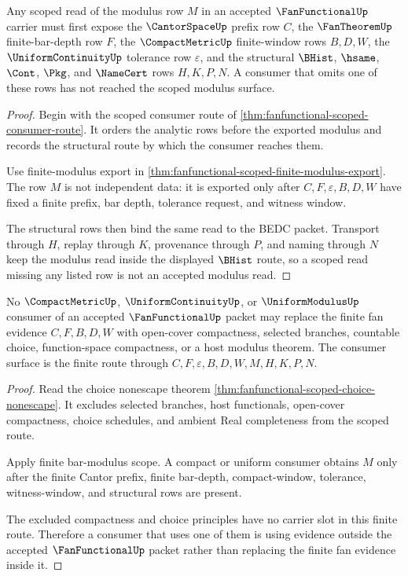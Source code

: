 \begin{theorem}
\label{thm:fanfunctional-finite-bar-modulus-scope}
Any scoped read of the modulus row $M$ in an accepted $\FanFunctionalUp$ carrier must first expose the $\CantorSpaceUp$ prefix row $C$, the $\FanTheoremUp$ finite-bar-depth row $F$, the $\CompactMetricUp$ finite-window rows $B,D,W$, the $\UniformContinuityUp$ tolerance row $\varepsilon$, and the structural $\BHist$, $\hsame$, $\Cont$, $\Pkg$, and $\NameCert$ rows $H,K,P,N$. A consumer that omits one of these rows has not reached the scoped modulus surface.
\end{theorem}
\begin{proof}
Begin with the scoped consumer route of \autoref{thm:fanfunctional-scoped-consumer-route}. It orders the analytic rows before the exported modulus and records the structural route by which the consumer reaches them.

Use finite-modulus export in \autoref{thm:fanfunctional-scoped-finite-modulus-export}. The row $M$ is not independent data: it is exported only after $C,F,\varepsilon,B,D,W$ have fixed a finite prefix, bar depth, tolerance request, and witness window.

The structural rows then bind the same read to the BEDC packet. Transport through $H$, replay through $K$, provenance through $P$, and naming through $N$ keep the modulus read inside the displayed $\BHist$ route, so a scoped read missing any listed row is not an accepted modulus read.
\end{proof}

\begin{theorem}
\label{thm:fanfunctional-compact-uniform-consumer-scope}
No $\CompactMetricUp$, $\UniformContinuityUp$, or $\UniformModulusUp$ consumer of an accepted $\FanFunctionalUp$ packet may replace the finite fan evidence $C,F,B,D,W$ with open-cover compactness, selected branches, countable choice, function-space compactness, or a host modulus theorem. The consumer surface is the finite route through $C,F,\varepsilon,B,D,W,M,H,K,P,N$.
\end{theorem}
\begin{proof}
Read the choice nonescape theorem \autoref{thm:fanfunctional-scoped-choice-nonescape}. It excludes selected branches, host functionals, open-cover compactness, choice schedules, and ambient Real completeness from the scoped route.

Apply finite bar-modulus scope. A compact or uniform consumer obtains $M$ only after the finite Cantor prefix, finite bar-depth, compact-window, tolerance, witness-window, and structural rows are present.

The excluded compactness and choice principles have no carrier slot in this finite route. Therefore a consumer that uses one of them is using evidence outside the accepted $\FanFunctionalUp$ packet rather than replacing the finite fan evidence inside it.
\end{proof}

